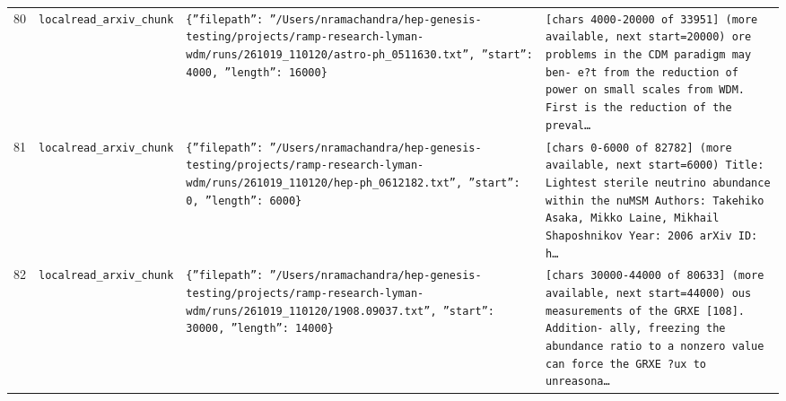 \documentclass[11pt,a4paper]{article}
\begin{document}
\begin{longtable}{@{}p{}p{}p{}p{}@{}}
80 & \texttt{local}\newline\texttt{read\_\allowbreak{}arxiv\_\allowbreak{}chunk} & \texttt{\{''filepath'':\allowbreak{} ''/\allowbreak{}Users/\allowbreak{}nramachandra/\allowbreak{}hep-genesis-testing/\allowbreak{}projects/\allowbreak{}ramp-research-lyman-wdm/\allowbreak{}runs/\allowbreak{}261019\_\allowbreak{}110120/\allowbreak{}astro-ph\_\allowbreak{}0511630.txt'',\allowbreak{} ''start'':\allowbreak{} 4000,\allowbreak{} ''length'':\allowbreak{} 16000\}\allowbreak{}} & \texttt{[chars 4000-20000 of 33951]\allowbreak{} (more available,\allowbreak{} next start=\allowbreak{}20000)\allowbreak{}  ore problems in the CDM paradigm may ben- e?t from the reduction of power on small scales from WDM. First is the reduction of the preval\ldots{}\allowbreak{}} \\
81 & \texttt{local}\newline\texttt{read\_\allowbreak{}arxiv\_\allowbreak{}chunk} & \texttt{\{''filepath'':\allowbreak{} ''/\allowbreak{}Users/\allowbreak{}nramachandra/\allowbreak{}hep-genesis-testing/\allowbreak{}projects/\allowbreak{}ramp-research-lyman-wdm/\allowbreak{}runs/\allowbreak{}261019\_\allowbreak{}110120/\allowbreak{}hep-ph\_\allowbreak{}0612182.txt'',\allowbreak{} ''start'':\allowbreak{} 0,\allowbreak{} ''length'':\allowbreak{} 6000\}\allowbreak{}} & \texttt{[chars 0-6000 of 82782]\allowbreak{} (more available,\allowbreak{} next start=\allowbreak{}6000)\allowbreak{}  Title:\allowbreak{} Lightest sterile neutrino abundance within the nuMSM Authors:\allowbreak{} Takehiko Asaka,\allowbreak{} Mikko Laine,\allowbreak{} Mikhail Shaposhnikov Year:\allowbreak{} 2006 arXiv ID:\allowbreak{} h\ldots{}\allowbreak{}} \\
82 & \texttt{local}\newline\texttt{read\_\allowbreak{}arxiv\_\allowbreak{}chunk} & \texttt{\{''filepath'':\allowbreak{} ''/\allowbreak{}Users/\allowbreak{}nramachandra/\allowbreak{}hep-genesis-testing/\allowbreak{}projects/\allowbreak{}ramp-research-lyman-wdm/\allowbreak{}runs/\allowbreak{}261019\_\allowbreak{}110120/\allowbreak{}1908.09037.txt'',\allowbreak{} ''start'':\allowbreak{} 30000,\allowbreak{} ''length'':\allowbreak{} 14000\}\allowbreak{}} & \texttt{[chars 30000-44000 of 80633]\allowbreak{} (more available,\allowbreak{} next start=\allowbreak{}44000)\allowbreak{}  ous measurements of the GRXE [108]\allowbreak{}. Addition- ally,\allowbreak{} freezing the abundance ratio to a nonzero value can force the GRXE ?ux to unreasona\ldots{}\allowbreak{}} \\

\end{longtable}
\end{document}

